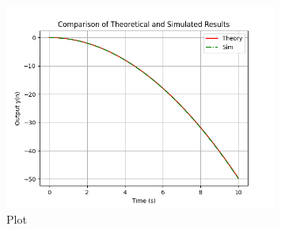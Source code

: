\documentclass[journal]{IEEEtran}
\numberwithin{equation}{enumi}
\numberwithin{figure}{enumi}
\begin{document}
\begin{figure}[H]
    \centering
    \includegraphics[width=0.8\textwidth]{figs/fig.png}
    \caption{Plot}
\end{figure}
\end{document}
